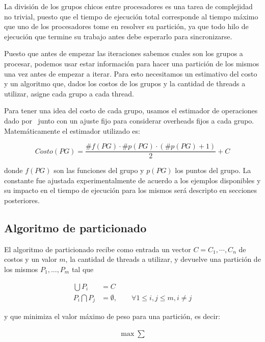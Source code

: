 La divisi\'on de los grupos chicos entre procesadores es una tarea de complejidad
no trivial, puesto que el tiempo de ejecuci\'on total corresponde al tiempo m\'aximo
que uno de los procesadores tome en resolver su partici\'on, ya que todo hilo de 
ejecuci\'on que termine su trabajo antes debe esperarlo para sincronizarse.

Puesto que antes de empezar las iteraciones sabemos cuales son los grupos a 
procesar, podemos usar estar informaci\'on para hacer una partici\'on de los mismos
una vez antes de empezar a iterar. Para esto necesitamos un estimativo del costo
y un algoritmo que, dados los costos de los grupos y la cantidad de threads a 
utilizar, asigne cada grupo a cada thread.

Para tener una idea del costo de cada grupo, usamos el estimador de operaciones
dado por~\cite{LIO} junto con un ajuste fijo para considerar overheads fijos a 
cada grupo. Matem\'aticamente el estimador utilizado es:

\begin{equation}
    Costo(PG) = \frac{\#f(PG) \cdot \#p(PG) \cdot (\#p(PG) + 1)}{2} + C
\end{equation}

donde $f(PG)$ son las funciones del grupo y $p(PG)$ los puntos del grupo. La 
constante fue ajustada experimentalmente de acuerdo a los ejemplos disponibles y
su impacto en el tiempo de ejecuci\'on para los mismos ser\'a descripto en 
secciones posteriores.

\subsection{Algoritmo de particionado}

El algoritmo de particionado recibe como entrada un vector $C = {C_1, \cdots, C_n}$
de costos y un valor $m$, la cantidad de threads a utilizar, y devuelve una 
partici\'on de los mismos $P_1, \dots, P_m$ tal que

\begin{align}
    \bigcup P_i & = C \\
    P_i \bigcap P_j & = \emptyset, \qquad \forall 1 \leq i,j \leq m, i \neq j
    \label{eq:partition-conditions}
\end{align}

y que minimiza el valor m\'aximo de peso para una partici\'on, es decir:

\begin{align}
    \max \sum 
\end{align}

